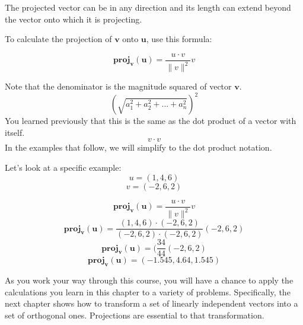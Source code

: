 
The projected vector can be in any direction and its length can extend beyond the vector onto which it is projecting.


To calculate the projection of 
$\mathbf{v}$ onto $\mathbf{u}$, use this formula:

$$\mathbf{proj}_\mathbf{v}(\mathbf{u}) = \frac{u\cdot v}{\parallel{v}\parallel ^2}v$$

Note that the denominator is the magnitude squared of vector $\mathbf{v}$.
$$(\sqrt{a_1^2 + a_2^2 + ... + a_n^2} )^2$$
You learned previously that this is the same as the dot product of a vector with itself.
$${v\cdot v}$$
In the examples that follow, we will simplify to the dot product notation.

Let's look at a specific example:
$$u = (1,4,6)$$ 
$$v = (-2,6,2)$$ 

$$\mathbf{proj}_\mathbf{v}(\mathbf{u}) = \frac{u\cdot v}{\parallel {v}\parallel ^2}v$$
$$\mathbf{proj}_\mathbf{v}(\mathbf{u}) = \frac{(1,4,6)\cdot(-2,6,2)}{ (-2,6,2)\cdot (-2,6,2)}(-2,6,2)$$
$$\mathbf{proj}_\mathbf{v}(\mathbf{u}) = (\frac{34}{44}(-2,6,2)$$
$$\mathbf{proj}_\mathbf{v}(\mathbf{u}) = (-1.545, 4.64, 1.545)$$

As you work your way through this course, you will have a chance to apply the calculations you learn in this chapter to a variety of problems. Specifically, the next chapter shows how to transform a set of linearly independent vectors into a set of orthogonal ones. Projections are essential to that transformation. 

